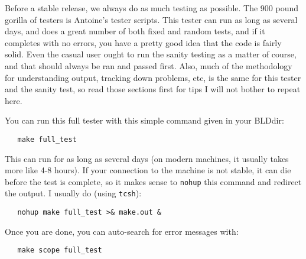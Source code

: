 \documentclass[11pt]{article}
\begin{document}
Before a stable release, we always do as much testing as possible.  The
900 pound gorilla of testers is Antoine's tester scripts.
This tester can run as long as several days, and does a great number of
both fixed and random tests, and if it completes with no errors, you have
a pretty good
idea that the code is fairly solid. 
Even the casual
user ought to run the sanity testing as a matter of course, and that should
always be ran and passed first.  Also, much of the methodology for 
understanding output, tracking down problems, etc, is the same for this
tester and the sanity test, so read those sections first for tips I will
not bother to repeat here.

You can run this full tester with this simple command given in your BLDdir:
\begin{verbatim}
   make full_test
\end{verbatim}

This can run for as long as several days (on modern machines, it usually
takes more like 4-8 hours).  If your connection to the machine is not
stable, it can die before the test is complete, so it makes sense to
{\tt nohup} this command and redirect the output.  I usually do (using
\texttt{tcsh}):
\begin{verbatim}
   nohup make full_test >& make.out &
\end{verbatim}


Once you are done, you can auto-search for error messages with:
\begin{verbatim}
   make scope full_test
\end{verbatim}
\end{document}
